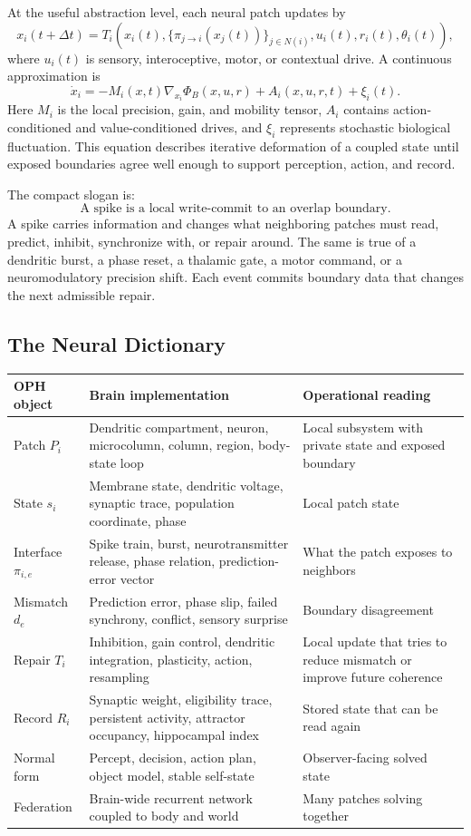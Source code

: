 \documentclass[11pt]{article}
\theoremstyle{remark}
\theoremstyle{plain}
\begin{document}
At the useful abstraction level, each neural patch updates by
\[
x_i(t+\Delta t)
=
T_i\!\left(
x_i(t),
\{\pi_{j\to i}(x_j(t))\}_{j\in N(i)},
u_i(t),
r_i(t),
\theta_i(t)
\right),
\]
where \(u_i(t)\) is sensory, interoceptive, motor, or contextual drive. A continuous approximation is
\[
\dot x_i
=
-M_i(x,t)\nabla_{x_i}\Phi_B(x,u,r)
+A_i(x,u,r,t)
+\xi_i(t).
\]
Here \(M_i\) is the local precision, gain, and mobility tensor, \(A_i\) contains action-conditioned and value-conditioned drives, and \(\xi_i\) represents stochastic biological fluctuation. This equation describes iterative deformation of a coupled state until exposed boundaries agree well enough to support perception, action, and record.

The compact slogan is:
\[
\boxed{
\text{A spike is a local write-commit to an overlap boundary.}
}
\]
A spike carries information and changes what neighboring patches must read, predict, inhibit, synchronize with, or repair around. The same is true of a dendritic burst, a phase reset, a thalamic gate, a motor command, or a neuromodulatory precision shift. Each event commits boundary data that changes the next admissible repair.

\subsection{The Neural Dictionary}

\begin{longtable}{L{0.22\textwidth}L{0.34\textwidth}L{0.34\textwidth}}
\toprule
\textbf{OPH object} & \textbf{Brain implementation} & \textbf{Operational reading} \\
\midrule
\endhead
Patch \(P_i\) & Dendritic compartment, neuron, microcolumn, column, region, body-state loop & Local subsystem with private state and exposed boundary \\
State \(s_i\) & Membrane state, dendritic voltage, synaptic trace, population coordinate, phase & Local patch state \\
Interface \(\pi_{i,e}\) & Spike train, burst, neurotransmitter release, phase relation, prediction-error vector & What the patch exposes to neighbors \\
Mismatch \(d_e\) & Prediction error, phase slip, failed synchrony, conflict, sensory surprise & Boundary disagreement \\
Repair \(T_i\) & Inhibition, gain control, dendritic integration, plasticity, action, resampling & Local update that tries to reduce mismatch or improve future coherence \\
Record \(R_i\) & Synaptic weight, eligibility trace, persistent activity, attractor occupancy, hippocampal index & Stored state that can be read again \\
Normal form & Percept, decision, action plan, object model, stable self-state & Observer-facing solved state \\
Federation & Brain-wide recurrent network coupled to body and world & Many patches solving together \\
\bottomrule
\end{longtable}
\end{document}

